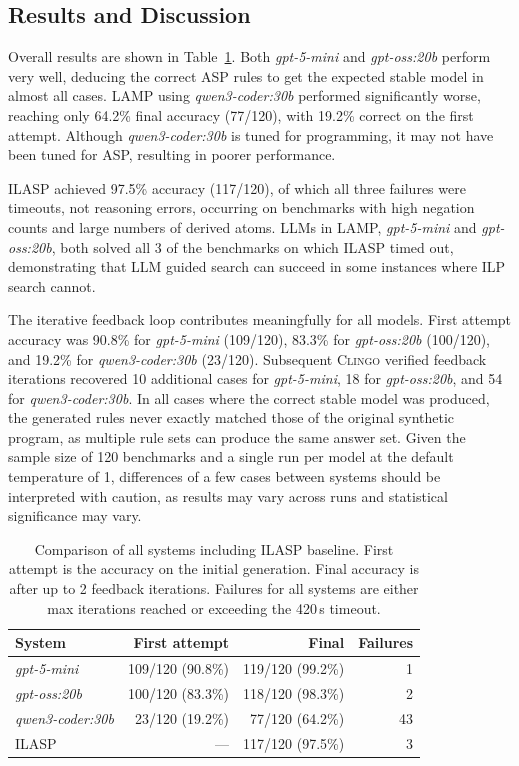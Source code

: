 \documentclass[11pt,a4paper]{article}
\begin{document}
\subsection{Results and Discussion}

Overall results are shown in Table~\ref{tab:ilasp_results}. Both \textit{gpt-5-mini} and \textit{gpt-oss:20b} perform very well, deducing the correct ASP rules to get the expected stable model in almost all cases. LAMP using \textit{qwen3-coder:30b} performed significantly worse, reaching only 64.2\% final accuracy (77/120), with 19.2\% correct on the first attempt. Although \textit{qwen3-coder:30b} is tuned for programming, it may not have been tuned for ASP, resulting in poorer performance.

ILASP achieved 97.5\% accuracy (117/120), of which all three failures were timeouts, not reasoning errors, occurring on benchmarks with high negation counts and large numbers of derived atoms. LLMs in LAMP, \textit{gpt-5-mini} and \textit{gpt-oss:20b}, both solved all 3 of the benchmarks on which ILASP timed out, demonstrating that LLM guided search can succeed in some instances where ILP search cannot.

The iterative feedback loop contributes meaningfully for all models. First attempt accuracy was 90.8\% for \textit{gpt-5-mini} (109/120), 83.3\% for \textit{gpt-oss:20b} (100/120), and 19.2\% for \textit{qwen3-coder:30b} (23/120). Subsequent \textsc{Clingo} verified feedback iterations recovered 10 additional cases for \textit{gpt-5-mini}, 18 for \textit{gpt-oss:20b}, and 54 for \textit{qwen3-coder:30b}. In all cases where the correct stable model was produced, the generated rules never exactly matched those of the original synthetic program, as multiple rule sets can produce the same answer set. Given the sample size of 120 benchmarks and a single run per model at the default temperature of 1, differences of a few cases between systems should be interpreted with caution, as results may vary across runs and statistical significance may vary.

\begin{table}[htbp]
    \centering
    \caption{Comparison of all systems including ILASP baseline. First attempt is the accuracy on the initial generation. Final accuracy is after up to 2 feedback iterations. Failures for all systems are either max iterations reached or exceeding the 420\,s timeout.}
    \label{tab:ilasp_results}
    \begin{tabular}{lrrr}
    \toprule
    System & First attempt & Final & Failures \\
    \midrule
    \textit{gpt-5-mini}       & 109/120 (90.8\%) & 119/120 (99.2\%) & 1  \\
    \textit{gpt-oss:20b}      & 100/120 (83.3\%) & 118/120 (98.3\%) & 2  \\
    \textit{qwen3-coder:30b}  & 23/120 (19.2\%)  & 77/120 (64.2\%)  & 43 \\
    ILASP                     & ---              & 117/120 (97.5\%) & 3  \\
    \bottomrule
    \end{tabular}
\end{table}
\end{document}
